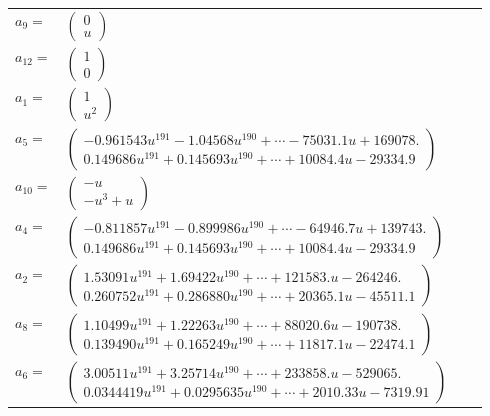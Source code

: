 \documentclass[1p]{elsarticle_modified}
\theoremstyle{definition}
\begin{document}
\begin{tabular}{m{7pt} m{180pt} m{7pt} m{180pt} }
\flushright $a_{9}=$&$\begin{pmatrix}0\\u\end{pmatrix}$ \\
\flushright $a_{12}=$&$\begin{pmatrix}1\\0\end{pmatrix}$ \\
\flushright $a_{1}=$&$\begin{pmatrix}1\\u^2\end{pmatrix}$ \\
\flushright $a_{5}=$&$\begin{pmatrix}-0.961543 u^{191}-1.04568 u^{190}+\cdots-75031.1 u+169078.\\0.149686 u^{191}+0.145693 u^{190}+\cdots+10084.4 u-29334.9\end{pmatrix}$ \\
\flushright $a_{10}=$&$\begin{pmatrix}- u\\- u^3+u\end{pmatrix}$ \\
\flushright $a_{4}=$&$\begin{pmatrix}-0.811857 u^{191}-0.899986 u^{190}+\cdots-64946.7 u+139743.\\0.149686 u^{191}+0.145693 u^{190}+\cdots+10084.4 u-29334.9\end{pmatrix}$ \\
\flushright $a_{2}=$&$\begin{pmatrix}1.53091 u^{191}+1.69422 u^{190}+\cdots+121583. u-264246.\\0.260752 u^{191}+0.286880 u^{190}+\cdots+20365.1 u-45511.1\end{pmatrix}$ \\
\flushright $a_{8}=$&$\begin{pmatrix}1.10499 u^{191}+1.22263 u^{190}+\cdots+88020.6 u-190738.\\0.139490 u^{191}+0.165249 u^{190}+\cdots+11817.1 u-22474.1\end{pmatrix}$ \\
\flushright $a_{6}=$&$\begin{pmatrix}3.00511 u^{191}+3.25714 u^{190}+\cdots+233858. u-529065.\\0.0344419 u^{191}+0.0295635 u^{190}+\cdots+2010.33 u-7319.91\end{pmatrix}$ \\

\end{tabular}
\end{document}
